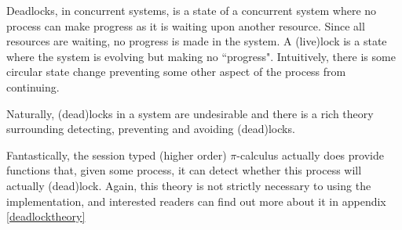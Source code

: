 Deadlocks, in concurrent systems, is a state of a concurrent system where no process can make progress as it is waiting upon another resource. Since all resources are waiting, no progress is made in the system. A (live)lock is a state where the system is evolving but making no ``progress". Intuitively, there is some circular state change preventing some other aspect of the process from continuing.

Naturally, (dead)locks in a system are undesirable and there is a rich theory  surrounding detecting, preventing and avoiding (dead)locks.

Fantastically, the session typed (higher order) $\pi$-calculus actually does provide functions that, given some process, it can detect whether this process will actually (dead)lock. Again, this theory is not strictly necessary to using the implementation, and interested readers can find out more about it in appendix \ref{deadlocktheory}